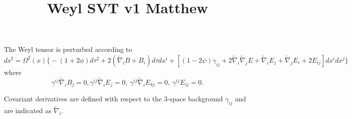 \documentclass[10pt,letterpaper]{article}
\title{Weyl SVT v1 Matthew}
\date{}
\begin{document}
\maketitle
\noindent
The Weyl tensor is perturbed according to
\begin{equation}
	ds^2 = \Omega^2(x) \big\{ -(1+2\phi) d\tau^2 + 2(\tilde\nabla_i B + B_i)d\tau dx^i + [ (1-2\psi)\gamma_{ij} + 2\tilde\nabla_i\tilde\nabla_j E + \tilde\nabla_i E_j + \tilde\nabla_j E_i + 2E_{ij}]dx^i dx^j\big\}
\end{equation}
where
\begin{equation}
	\gamma^{ij}\tilde\nabla_i B_j = 0,\gamma^{ij}\tilde\nabla_i E_j = 0,\ \gamma^{ij}\tilde\nabla_i E_{kj} = 0,\ \gamma^{ij}E_{ij} = 0.
\end{equation}

\noindent Covariant derivatives are defined with respect to the 3-space background $\gamma_{ij}$ and are indicated as $ \tilde\nabla_i$. 
\end{document}
